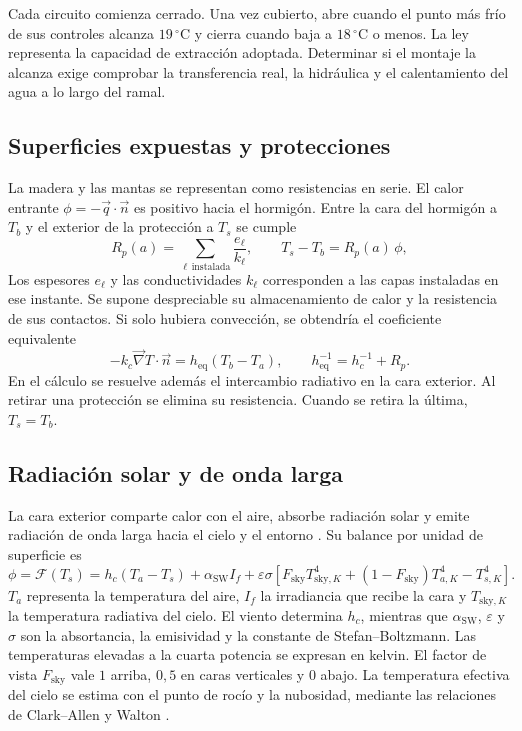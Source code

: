Cada circuito comienza cerrado. Una vez cubierto, abre cuando el punto más frío de sus controles alcanza $19\,^\circ\mathrm C$ y cierra cuando baja a $18\,^\circ\mathrm C$ o menos. La ley representa la capacidad de extracción adoptada. Determinar si el montaje la alcanza exige comprobar la transferencia real, la hidráulica y el calentamiento del agua a lo largo del ramal.

\subsection{Superficies expuestas y protecciones}
La madera y las mantas se representan como resistencias en serie. El calor entrante $\phi=-\vec q\cdot\vec n$ es positivo hacia el hormigón. Entre la cara del hormigón a $T_b$ y el exterior de la protección a $T_s$ se cumple
\begin{equation}
  R_p(a)=\sum_{\ell\,\mathrm{instalada}}\frac{e_\ell}{k_\ell},
  \qquad T_s-T_b=R_p(a)\,\phi,
  \label{eq:resistencia-proteccion}
\end{equation}
Los espesores $e_\ell$ y las conductividades $k_\ell$ corresponden a las capas instaladas en ese instante. Se supone despreciable su almacenamiento de calor y la resistencia de sus contactos. Si solo hubiera convección, se obtendría el coeficiente equivalente
\begin{equation}
  -k_c\vec{\nabla} T\cdot\vec{n}=h_{\mathrm{eq}}(T_b-T_a),
  \qquad h_{\mathrm{eq}}^{-1}=h_c^{-1}+R_p.
  \label{eq:robin-equivalente}
\end{equation}
En el cálculo se resuelve además el intercambio radiativo en la cara exterior. Al retirar una protección se elimina su resistencia. Cuando se retira la última, $T_s=T_b$.

\subsection{Radiación solar y de onda larga}
La cara exterior comparte calor con el aire, absorbe radiación solar y emite radiación de onda larga hacia el cielo y el entorno \citep{energyplusMcAdams}. Su balance por unidad de superficie es
\begin{equation}
  \phi=\mathcal F(T_s)
  =h_c(T_a-T_s)+\alpha_{\mathrm{SW}}I_f
   +\varepsilon\sigma\left[
      F_{\mathrm{sky}}T_{\mathrm{sky},K}^{4}
      +(1-F_{\mathrm{sky}})T_{a,K}^{4}-T_{s,K}^{4}\right].
  \label{eq:balance-exterior}
\end{equation}
$T_a$ representa la temperatura del aire, $I_f$ la irradiancia que recibe la cara y $T_{\mathrm{sky},K}$ la temperatura radiativa del cielo. El viento determina $h_c$, mientras que $\alpha_{\mathrm{SW}}$, $\varepsilon$ y $\sigma$ son la absortancia, la emisividad y la constante de Stefan--Boltzmann. Las temperaturas elevadas a la cuarta potencia se expresan en kelvin. El factor de vista $F_{\mathrm{sky}}$ vale $1$ arriba, $0{,}5$ en caras verticales y $0$ abajo. La temperatura efectiva del cielo se estima con el punto de rocío y la nubosidad, mediante las relaciones de Clark--Allen y Walton \citep{energyplusCielo}.

